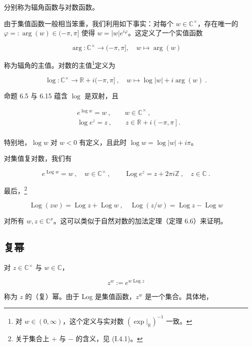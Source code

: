 分别称为辐角函数与对数函数。

由于集值函数一般相当笨重，我们利用如下事实：对每个 $w \in \mathbb{C}^\times$，存在唯一的 $\varphi =: \arg(w) \in (-\pi, \pi]$ 使得 $w = |w| e^{i\varphi}$。这定义了一个实值函数

\[
\arg:\mathbb{C}^{\times}\to(-\pi,\pi],\quad w\mapsto\arg(w)
\]

称为辐角的主值。对数的主值\footnote{对 $w \in (0, \infty)$，这个定义与实对数 $(\exp|_{\mathbb{R}})^{-1}$ 一致。}定义为

\[
\operatorname{l o g}\colon\mathbb{C}^{\times}\to\mathbb{R}+i(-\pi,\pi]~,\quad w\mapsto\operatorname{l o g}|w|+i\operatorname{a r g}(w)~.
\]

命题 6.5 与 6.15 蕴含 $ \log $ 是双射，且

\begin{equation}
\begin{aligned}
&e^{\log w}=w\ ,\qquad w\in\mathbb{C}^{\times}\ ,\\&\log e^{z}=z\ ,\qquad z\in\mathbb{R}+i\left(-\pi,\pi\right].\\
\end{aligned}
\end{equation}

特别地，$ \log w $ 对 $ w < 0 $ 有定义，且此时 $ \log w = \log |w| + i\pi $。

对集值复对数，我们有

\[
e^{\operatorname{L o g}w}=w~,\quad w\in\mathbb{C}^{\times}~,\qquad\operatorname{L o g}e^{z}=z+2\pi i\mathbb{Z}~,\quad z\in\mathbb{C}~.
\]

最后，\footnote{关于集合上 $+$ 与 $-$ 的含义，见 (I.4.1)。}

\begin{equation}
\operatorname{Log}(zw)=\operatorname{Log}z+\operatorname{Log}w~,\quad\operatorname{Log}(z/w)=\operatorname{Log}z-\operatorname{Log}w
\end{equation}

对所有 $ w, z \in \mathbb{C}^x $。这可以类似于自然对数的加法定理（定理 6.6）来证明。

\subsection*{复幂}

对 $ z \in \mathbb{C}^\times $ 与 $ w \in \mathbb{C} $，

\[
z^{w}:=e^{w\operatorname{L o g}z}
\]

称为 $ z $ 的（复）幂。由于 Log 是集值函数，$ z^{w} $ 是一个集合。具体地，


